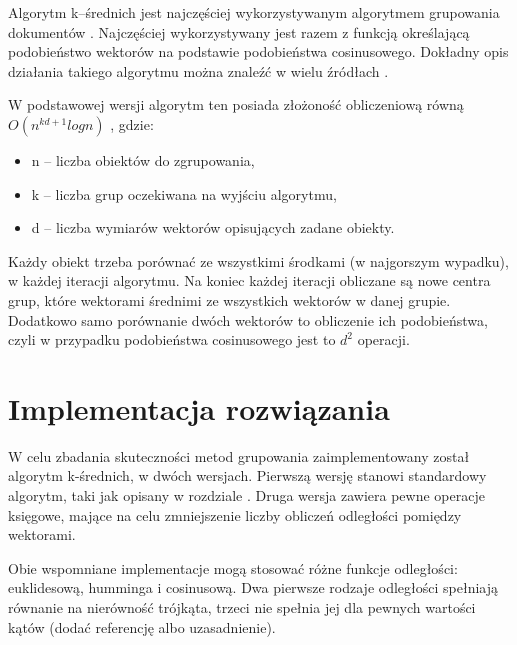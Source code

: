 \documentclass{article}
\begin{document}
Algorytm k--średnich jest najczęściej wykorzystywanym algorytmem grupowania dokumentów . Najczęściej wykorzystywany jest razem z funkcją określającą podobieństwo wektorów na podstawie podobieństwa cosinusowego. Dokładny opis działania takiego algorytmu można znaleźć w wielu źródłach . 

W podstawowej wersji algorytm ten posiada złożoność obliczeniową równą $O(n^{kd+1}log n)$ , gdzie:
\begin{itemize}
	\item n – liczba obiektów do zgrupowania,
	\item k – liczba grup oczekiwana na wyjściu algorytmu,
	\item d – liczba wymiarów wektorów opisujących zadane obiekty.
\end{itemize}
Każdy obiekt trzeba porównać ze wszystkimi środkami (w najgorszym wypadku), w każdej iteracji algorytmu. Na koniec każdej iteracji obliczane są nowe centra grup, które wektorami średnimi ze wszystkich wektorów w danej grupie. Dodatkowo samo porównanie dwóch wektorów to obliczenie ich podobieństwa, czyli w przypadku podobieństwa cosinusowego jest to $d^2$ operacji.


\section{Implementacja rozwiązania}
W celu zbadania skuteczności metod grupowania zaimplementowany został algorytm k-średnich, w dwóch wersjach. Pierwszą wersję stanowi standardowy algorytm, taki jak opisany w rozdziale . Druga wersja zawiera pewne operacje księgowe, mające na celu zmniejszenie liczby obliczeń odległości pomiędzy wektorami.

Obie wspomniane implementacje mogą stosować różne funkcje odległości: euklidesową, humminga i cosinusową. Dwa pierwsze rodzaje odległości spełniają równanie na nierówność trójkąta, trzeci nie spełnia jej  dla pewnych wartości kątów (dodać referencję albo uzasadnienie).
\end{document}
